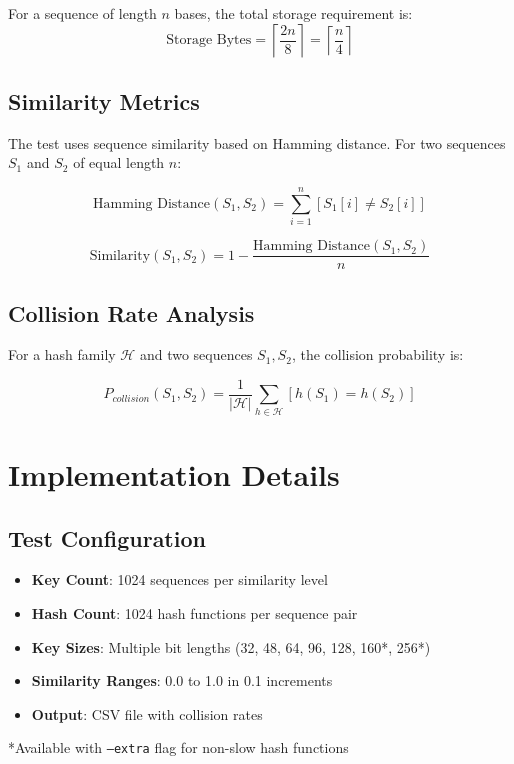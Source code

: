 \documentclass[11pt,a4paper]{article}
\begin{document}
For a sequence of length $n$ bases, the total storage requirement is:
\begin{equation}
\text{Storage Bytes} = \left\lceil \frac{2n}{8} \right\rceil = \left\lceil \frac{n}{4} \right\rceil
\end{equation}

\subsection{Similarity Metrics}

The test uses sequence similarity based on Hamming distance. For two sequences $S_1$ and $S_2$ of equal length $n$:

\begin{equation}
\text{Hamming Distance}(S_1, S_2) = \sum_{i=1}^{n} [S_1[i] \neq S_2[i]]
\end{equation}

\begin{equation}
\text{Similarity}(S_1, S_2) = 1 - \frac{\text{Hamming Distance}(S_1, S_2)}{n}
\end{equation}

\subsection{Collision Rate Analysis}

For a hash family $\mathcal{H}$ and two sequences $S_1, S_2$, the collision probability is:

\begin{equation}
P_{collision}(S_1, S_2) = \frac{1}{|\mathcal{H}|} \sum_{h \in \mathcal{H}} [h(S_1) = h(S_2)]
\end{equation}

\section{Implementation Details}

\subsection{Test Configuration}

\begin{tcolorbox}[colback=blue!5!white,colframe=blue!75!black,title=Key Parameters]
\begin{itemize}
    \item \textbf{Key Count}: 1024 sequences per similarity level
    \item \textbf{Hash Count}: 1024 hash functions per sequence pair
    \item \textbf{Key Sizes}: Multiple bit lengths (32, 48, 64, 96, 128, 160*, 256*)
    \item \textbf{Similarity Ranges}: 0.0 to 1.0 in 0.1 increments
    \item \textbf{Output}: CSV file with collision rates
\end{itemize}
\small{*Available with \texttt{--extra} flag for non-slow hash functions}
\end{tcolorbox}
\end{document}
